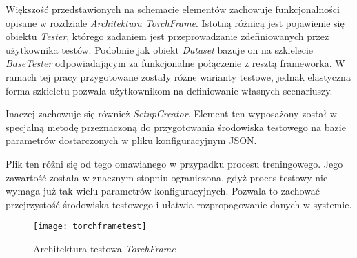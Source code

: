     Większość przedstawionych na schemacie elementów zachowuje funkcjonalności
    opisane w rozdziale \textit{Architektura TorchFrame}. Istotną różnicą jest
    pojawienie się obiektu \textit{Tester}, którego zadaniem jest przeprowadzanie
    zdefiniowanych przez użytkownika testów. Podobnie jak obiekt \textit{Dataset} bazuje
    on na szkielecie \textit{BaseTester} odpowiadającym za funkcjonalne połączenie z
    resztą frameworka. W ramach tej pracy przygotowane zostały różne warianty
    testowe, jednak elastyczna forma szkieletu pozwala użytkownikom
    na definiowanie własnych scenariuszy.

    Inaczej zachowuje się również \textit{SetupCreator}. Element ten wyposażony został w specjalną
    metodę przeznaczoną do przygotowania środowiska testowego na bazie parametrów
    dostarczonych w pliku konfiguracyjnym JSON.

    Plik ten różni się od tego omawianego w przypadku procesu treningowego. Jego
    zawartość została w znacznym stopniu ograniczona, gdyż proces testowy nie
    wymaga już tak wielu parametrów konfiguracyjnych. Pozwala to zachować
    przejrzystość środowiska testowego i ułatwia rozpropagowanie danych
    w systemie.

    \begin{figure}[h!]
      \centering
      \texttt{[image: torchframetest]}
      \caption[Architektura testowa \textit{TorchFrame} - źródło: Praca własna]{Architektura testowa \textit{TorchFrame}}
      \label{fig:torchframetest}
    \end{figure}
